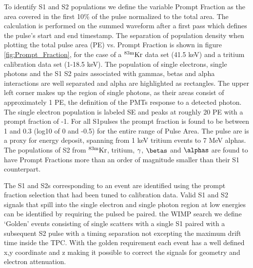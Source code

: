 To identify S1 and S2 populations we define the variable Prompt Fraction as the area covered in the first 10\% of the pulse normalized to the total area. The calculation is performed on the summed waveform after a first pass which defines the pulse's start and end timestamp. 
The separation of population density when plotting the total pulse area (PE) vs. Prompt Fraction is shown in figure \ref{fig:Prompt_Fraction},  for the case of a $\rm ^{83m}Kr$ data set (41.5 keV) and a tritium calibration data set (1-18.5 keV). The population of single electrons, single photons and the S1 S2 pairs associated with gammas, betas and alpha interactions are well separated and alpha are highlighted as rectangles. The upper left corner makes up the region of single photons, as their areas consist of approximately 1 PE, the definition of the PMTs response to a detected photon. The single electron population is labeled SE and peaks at roughly 20 PE with a prompt fraction of -1. For all S1pulses the prompt fraction is found to be between 1 and 0.3 (log10 of 0 and -0.5) for the entire range of Pulse Area. The pulse are is a proxy for energy deposit, spanning from 1 keV tritium events to 7 MeV alphas. The populations of S2 from $\rm^{83m}Kr$, tritium, $\rm \gamma$, $\rm \betas$ and $\rm \alphas$ are found to have Prompt Fractions more than an order of magnitude smaller than their S1 counterpart. 


The S1 and S2s corresponding to an event are identified using the prompt fraction selection that had been tuned to calibration data. Valid S1 and S2 signals that spill into the single electron and single photon region at low energies can be identified by requiring the pulsed be paired.  the WIMP search we define `Golden' events consisting of single scatters with a single S1 paired with a subsequent S2 pulse with a timing separation not excepting the maximum drift time inside the TPC. With the golden requirement each event has a well defined x,y coordinate and z making it possible to correct the signals for geometry and electron attenuation. 

